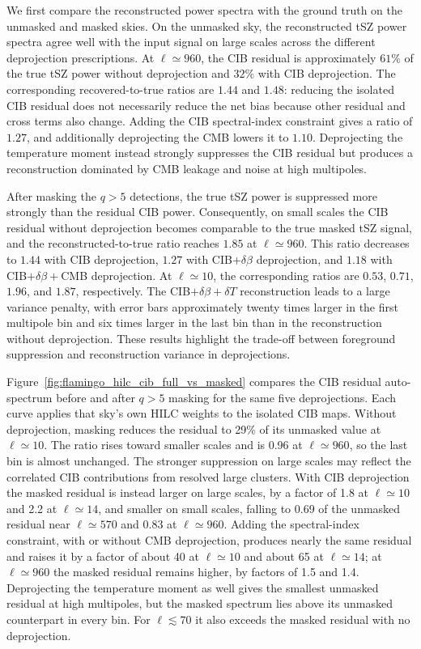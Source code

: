 \documentclass[aps,prd,twocolumn,superscriptaddress,nofootinbib,floatfix]{revtex4-2}
\begin{document}
We first compare the reconstructed power spectra with the ground truth on the unmasked and masked skies. On the unmasked sky, the reconstructed tSZ power spectra agree well with the input signal on large scales across the different deprojection prescriptions. At $\ell\simeq960$, the CIB residual is approximately $61\%$ of the true tSZ power without deprojection and $32\%$ with CIB deprojection. The corresponding recovered-to-true ratios are $1.44$ and $1.48$: reducing the isolated CIB residual does not necessarily reduce the net bias because other residual and cross terms also change. Adding the CIB spectral-index constraint gives a ratio of $1.27$, and additionally deprojecting the CMB lowers it to $1.10$. Deprojecting the temperature moment instead strongly suppresses the CIB residual but produces a reconstruction dominated by CMB leakage and noise at high multipoles. 

After masking the $q>5$ detections, the true tSZ power is suppressed more strongly than the residual CIB power. Consequently, on small scales the CIB residual without deprojection becomes comparable to the true masked tSZ signal, and the reconstructed-to-true ratio reaches $1.85$ at $\ell\simeq960$. This ratio decreases to $1.44$ with CIB deprojection, $1.27$ with CIB$+\delta\beta$ deprojection, and $1.18$ with CIB$+\delta\beta+$CMB deprojection. At $\ell\simeq10$, the corresponding ratios are $0.53$, $0.71$, $1.96$, and $1.87$, respectively. The CIB$+\delta\beta+\delta T$ reconstruction leads to a large variance penalty, with error bars approximately twenty times larger in the first multipole bin and six times larger in the last bin than in the reconstruction without deprojection. These results highlight the trade-off between foreground suppression and reconstruction variance in deprojections.

Figure~\ref{fig:flamingo_hilc_cib_full_vs_masked} compares the CIB residual auto-spectrum before and after $q>5$ masking for the same five deprojections. Each curve applies that sky's own HILC weights to the isolated CIB maps. Without deprojection, masking reduces the residual to 29\% of its unmasked value at $\ell \simeq 10$. The ratio rises toward smaller scales and is 0.96 at $\ell \simeq 960$, so the last bin is almost unchanged. The stronger suppression on large scales may reflect the correlated CIB contributions from resolved large clusters. With CIB deprojection the masked residual is instead larger on large scales, by a factor of 1.8 at $\ell \simeq 10$ and 2.2 at $\ell \simeq 14$, and smaller on small scales, falling to 0.69 of the unmasked residual near $\ell \simeq 570$ and 0.83 at $\ell \simeq 960$. Adding the spectral-index constraint, with or without CMB deprojection, produces nearly the same residual and raises it by a factor of about 40 at $\ell \simeq 10$ and about 65 at $\ell \simeq 14$; at $\ell \simeq 960$ the masked residual remains higher, by factors of 1.5 and 1.4. Deprojecting the temperature moment as well gives the smallest unmasked residual at high multipoles, but the masked spectrum lies above its unmasked counterpart in every bin. For $\ell \lesssim 70$ it also exceeds the masked residual with no deprojection. 
\end{document}

